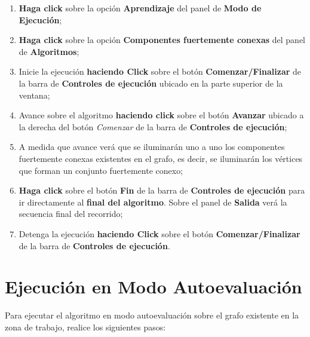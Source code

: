 \documentclass{book}
\begin{document}
\begin{enumerate}
	\itemsep=8pt \topsep=0pt \partopsep=0pt \parskip=0pt \parsep=0pt

	\item \textbf{Haga click} sobre la opción \textbf{Aprendizaje} del panel de \textbf{Modo de Ejecución};

	\item \textbf{Haga click} sobre la opción \textbf{Componentes fuertemente conexas} del panel de \textbf{Algoritmos};

	\item Inicie la ejecución \textbf{haciendo Click} sobre el botón \textbf{Comenzar/Finalizar} de la barra de \textbf{Controles de ejecución} ubicado en la parte superior de la ventana;

	\item Avance sobre el algoritmo \textbf{haciendo click} sobre el botón \textbf{Avanzar} ubicado a la derecha del botón \textit{Comenzar} de la barra de \textbf{Controles de ejecución};

	\item A medida que avance verá que se iluminarán uno a uno los componentes fuertemente conexas existentes en el grafo, es decir, se iluminarán los vértices que forman un conjunto fuertemente conexo;

	\item \textbf{Haga click} sobre el botón \textbf{Fin} de la barra de \textbf{Controles de ejecución} para ir directamente al \textbf{final del algoritmo}. Sobre el panel de \textbf{Salida} verá la secuencia final del recorrido;

	\item Detenga la ejecución \textbf{haciendo Click} sobre el botón \textbf{Comenzar/Finalizar} de la barra de \textbf{Controles de ejecución}.

\end{enumerate}
\medskip



\section{Ejecución en Modo Autoevaluación}

Para ejecutar el algoritmo en modo autoevaluación sobre el grafo existente en la zona de trabajo, realice los siguientes pasos:
\medskip
\end{document}
